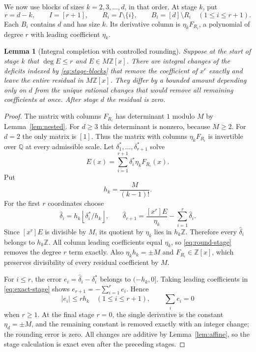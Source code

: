 \documentclass[11pt,a4paper]{article}
\newtheorem{lemma}[theorem]{Lemma}
\theoremstyle{definition}
\newcommand{\Z}{\mathbb Z}
\newcommand{\Q}{\mathbb Q}
\begin{document}
We now use blocks of sizes $k=2,3,\ldots,d$, in that order.
At stage $k$, put
\begin{equation}\label{eq:stage-blocks}
 r=d-k,\qquad I=[r+1],\qquad
 R_i=I\setminus\{i\},\qquad B_i=[d]\setminus R_i
 \quad(1\le i\le r+1).
\end{equation}
Each $B_i$ contains $d$ and has size $k$. Its derivative column is
$\eta_k F_{R_i}$, a polynomial of degree $r$ with leading coefficient
$\eta_k$.

\begin{lemma}[Integral completion with controlled rounding]
\label{lem:completion}
Suppose at the start of stage $k$ that $\deg E\le r$ and
$E\in M\Z[x]$. There are integral changes of the deficits indexed by
\eqref{eq:stage-blocks} that remove the coefficient of $x^r$ exactly
and leave the entire residual in $M\Z[x]$.
They differ by a bounded amount depending only on $d$ from the unique
rational changes that would remove all remaining coefficients at once.
After stage $d$ the residual is zero.
\end{lemma}
\begin{proof}
The matrix with columns $F_{R_i}$ has determinant $1$ modulo $M$ by
Lemma~\ref{lem:nested}. For $d\ge3$ this determinant is nonzero, because
$M\ge2$. For $d=2$ the only matrix is $[1]$. Thus the matrix with columns
$\eta_k F_{R_i}$ is invertible over $\Q$ at every admissible scale.
Let $\delta_1^*,\ldots,\delta_{r+1}^*$ solve
\begin{equation}\label{eq:exact-stage}
 E(x)=\sum_{i=1}^{r+1}\delta_i^*\eta_kF_{R_i}(x).
\end{equation}
Put
\begin{equation}\label{eq:lattice-step}
 h_k=\frac{M}{(k-1)!}.
\end{equation}
For the first $r$ coordinates choose
\begin{equation}\label{eq:round-stage}
 \widehat\delta_i=h_k\left\lfloor\delta_i^*/h_k\right\rfloor,
 \qquad
 \widehat\delta_{r+1}=
 \frac{[x^r]E}{\eta_k}-\sum_{i=1}^r\widehat\delta_i.
\end{equation}
Since $[x^r]E$ is divisible by $M$, its quotient by $\eta_k$ lies in
$h_k\Z$. Therefore every $\widehat\delta_i$ belongs to $h_k\Z$.
All column leading coefficients equal $\eta_k$, so
\eqref{eq:round-stage} removes the degree $r$ term exactly.
Also $\eta_kh_k=\pm M$ and $F_{R_i}\in\Z[x]$, which preserves
divisibility of every residual coefficient by $M$.

For $i\le r$, the error
$e_i=\widehat\delta_i-\delta_i^*$ belongs to $(-h_k,0]$.
Taking leading coefficients in \eqref{eq:exact-stage} shows
$e_{r+1}=-\sum_{i=1}^re_i$. Hence
\begin{equation}\label{eq:round-error}
 |e_i|\le r h_k\quad(1\le i\le r+1),\qquad \sum_i e_i=0
\end{equation}
when $r\ge1$. At the final stage $r=0$, the single derivative is the
constant $\eta_d=\pm M$, and the remaining constant is removed exactly
with an integer change; the rounding error is zero.
All changes are additive by Lemma~\ref{lem:affine}, so the stage
calculation is exact even after the preceding stages.
\end{proof}
\end{document}
